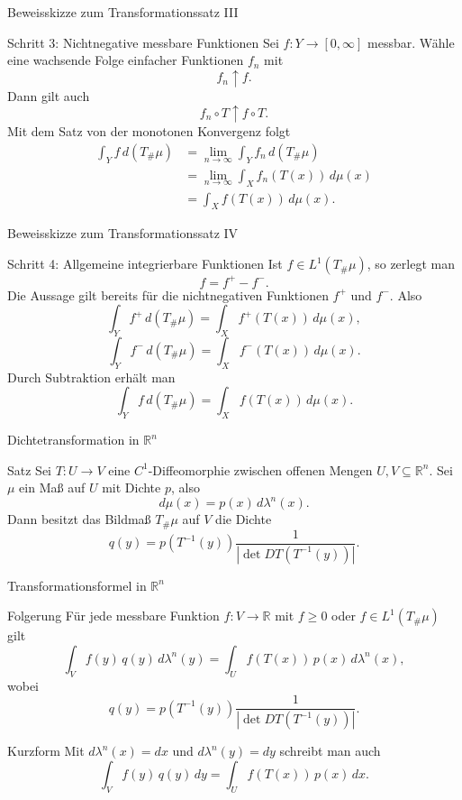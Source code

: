 \documentclass{beamer}
\begin{document}
\begin{frame}{Beweisskizze zum Transformationssatz III}
\begin{block}{Schritt 3: Nichtnegative messbare Funktionen}
Sei \(f\colon Y\to[0,\infty]\) messbar.
Wähle eine wachsende Folge einfacher Funktionen \(f_n\) mit
\[
f_n\uparrow f.
\]
Dann gilt auch
\[
f_n\circ T \uparrow f\circ T.
\]
Mit dem Satz von der monotonen Konvergenz folgt
\begin{align*}
\int_Y f\,d(T_\#\mu)
&=
\lim_{n\to\infty}\int_Y f_n\,d(T_\#\mu)\\
&=
\lim_{n\to\infty}\int_X f_n(T(x))\,d\mu(x)\\
&=
\int_X f(T(x))\,d\mu(x).
\end{align*}
\end{block}
\end{frame}

\begin{frame}{Beweisskizze zum Transformationssatz IV}
\begin{block}{Schritt 4: Allgemeine integrierbare Funktionen}
Ist \(f\in L^1(T_\#\mu)\), so zerlegt man
\[
f=f^+-f^-.
\]
Die Aussage gilt bereits für die nichtnegativen Funktionen \(f^+\) und \(f^-\). Also
\[
\int_Y f^+\,d(T_\#\mu)
=
\int_X f^+(T(x))\,d\mu(x),
\]
\[
\int_Y f^-\,d(T_\#\mu)
=
\int_X f^-(T(x))\,d\mu(x).
\]
Durch Subtraktion erhält man
\[
\int_Y f\,d(T_\#\mu)
=
\int_X f(T(x))\,d\mu(x).
\]
\end{block}
\end{frame}

\begin{frame}{Dichtetransformation in \(\mathbb R^n\)}
\begin{block}{Satz}
Sei \(T\colon U\to V\) eine \(C^1\)-Diffeomorphie zwischen offenen Mengen
\(U,V\subseteq\mathbb R^n\).
Sei \(\mu\) ein Maß auf \(U\) mit Dichte \(p\), also
\[
d\mu(x)=p(x)\,d\lambda^n(x).
\]
Dann besitzt das Bildmaß \(T_\#\mu\) auf \(V\) die Dichte
\[
q(y)=p(T^{-1}(y))
\frac{1}{|\det DT(T^{-1}(y))|}.
\]
\end{block}
\end{frame}

\begin{frame}{Transformationsformel in \(\mathbb R^n\)}
\begin{block}{Folgerung}
Für jede messbare Funktion \(f\colon V\to\mathbb R\) mit \(f\ge 0\) oder \(f\in L^1(T_\#\mu)\) gilt
\[
\int_V f(y)\,q(y)\,d\lambda^n(y)
=
\int_U f(T(x))\,p(x)\,d\lambda^n(x),
\]
wobei
\[
q(y)=p(T^{-1}(y))
\frac{1}{|\det DT(T^{-1}(y))|}.
\]
\end{block}

\begin{block}{Kurzform}
Mit \(d\lambda^n(x)=dx\) und \(d\lambda^n(y)=dy\) schreibt man auch
\[
\int_V f(y)\,q(y)\,dy
=
\int_U f(T(x))\,p(x)\,dx.
\]
\end{block}
\end{frame}
\end{document}
